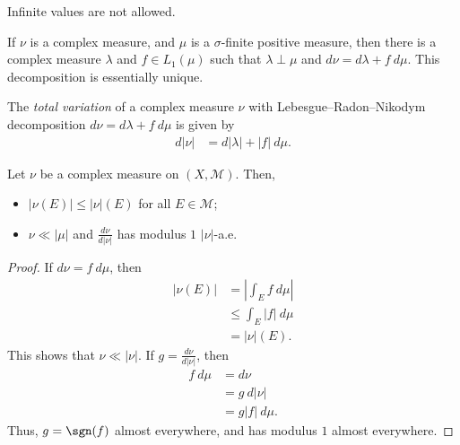 \documentclass[10pt]{mypackage}
\begin{document}
\begin{note}
  Infinite values are not allowed.
\end{note}
\begin{theorem}
  If $\nu$ is a complex measure, and $\mu$ is a $\sigma$-finite positive measure, then there is a complex measure $\lambda$ and $f\in L_1\left( \mu \right)$ such that $\lambda\perp \mu$ and $d\nu = d\lambda + f\:d\mu$. This decomposition is essentially unique.
\end{theorem}
\begin{definition}
  The \textit{total variation} of a complex measure $\nu$ with Lebesgue--Radon--Nikodym decomposition $d\nu = d\lambda + f\:d\mu$ is given by
  \begin{align*}
    d\left\vert \nu \right\vert &= d\left\vert \lambda \right\vert + \left\vert f \right\vert\:d\mu.
  \end{align*}
\end{definition}
\begin{proposition}
  Let $\nu$ be a complex measure on $\left( X,\mathcal{M} \right)$. Then,
  \begin{itemize}
    \item $\left\vert \nu\left( E \right) \right\vert \leq \left\vert \nu \right\vert\left( E \right)$ for all $E\in \mathcal{M}$;
    \item $\nu\ll \left\vert \mu \right\vert$ and $\frac{d\nu}{d\left\vert \nu \right\vert}$ has modulus $1$ $\left\vert \nu \right\vert$-a.e.
  \end{itemize}
\end{proposition}
\begin{proof}
  If $d\nu = f\:d\mu$, then
  \begin{align*}
    \left\vert \nu\left( E \right) \right\vert &= \left\vert \int_{E}^{} f\:d\mu \right\vert\\
                                               &\leq \int_{E}^{} \left\vert f \right\vert\:d\mu\\
                                               &= \left\vert \nu \right\vert\left( E \right).
  \end{align*}
  This shows that $\nu\ll \left\vert \nu \right\vert$. If $g = \frac{d\nu}{d\left\vert \nu \right\vert}$, then 
  \begin{align*}
    f\:d\mu &= d\nu\\
            &= g\:d\left\vert \nu \right\vert\\
            &= g\left\vert f \right\vert\:d\mu.
  \end{align*}
  Thus, $g = \sgn(f)$ almost everywhere, and has modulus $1$ almost everywhere.
\end{proof}
\end{document}
